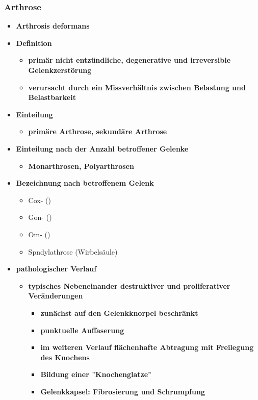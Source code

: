	\subsubsection{Arthrose}
		\begin{itemize}
			\item \textbf{Arthrosis deformans}
			\item \textbf{Definition}
				\begin{itemize}
					\item \textbf{primär nicht entzündliche, degenerative und irreversible Gelenkzerstörung}
					\item \textbf{verursacht durch ein Missverhältnis zwischen Belastung und Belastbarkeit}
				\end{itemize}
			\item \textbf{Einteilung}
				\begin{itemize}
					\item \textbf{primäre Arthrose, sekundäre Arthrose}
				\end{itemize}
			\item \textbf{Einteilung nach der Anzahl betroffener Gelenke}
				\begin{itemize}
					\item \textbf{Monarthrosen, Polyarthrosen}
				\end{itemize}
			\item \textbf{Bezeichnung nach betroffenem Gelenk}
				\begin{itemize}
					\item Cox- ()
					\item Gon- ()
					\item Om- ()
					\item Spndylathrose (Wirbelsäule)
				\end{itemize}
			\item \textbf{pathologischer Verlauf}
				\begin{itemize}
					\item \textbf{typisches Nebeneinander destruktiver und proliferativer Veränderungen}
						\begin{itemize}
							\item \textbf{zunächst auf den Gelenkknorpel beschränkt}
							\item \textbf{punktuelle Auffaserung}
							\item \textbf{im weiteren Verlauf flächenhafte Abtragung mit Freilegung des Knochens}
							\item \textbf{Bildung einer "Knochenglatze"}
							\item \textbf{Gelenkkapsel: Fibrosierung und Schrumpfung}

\end{itemize}
\end{itemize}
\end{itemize}
